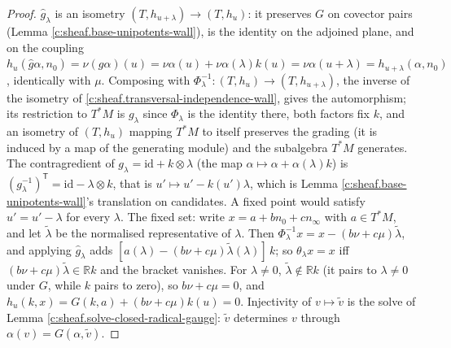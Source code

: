 \documentclass[11pt]{article}
\theoremstyle{definition}
\theoremstyle{plain}
\providecommand{\R}{}\renewcommand{\R}{\mathbb{R}}
\providecommand{\id}{}\renewcommand{\id}{\mathrm{id}}
\providecommand{\nInf}{}\renewcommand{\nInf}{n_\infty}
\providecommand{\nO}{}\renewcommand{\nO}{n_0}
\begin{document}
\begin{proof}
$\hat g_\lambda$ is an isometry $(T, h_{u+\lambda}) \to (T, h_u)$: it preserves $G$ on covector pairs (Lemma \ref{c:sheaf.base-unipotents-wall}), is the identity on the adjoined plane, and on the coupling $h_u(\hat g\alpha, \nO) = \nu(g\alpha)(u) = \nu\alpha(u) + \nu\alpha(\lambda)k(u) = \nu\alpha(u+\lambda) = h_{u+\lambda}(\alpha, \nO)$, identically with $\mu$. Composing with $\Phi_\lambda^{-1} : (T, h_u) \to (T, h_{u+\lambda})$, the inverse of the isometry of \ref{c:sheaf.transversal-independence-wall}, gives the automorphism; its restriction to $T^*M$ is $g_\lambda$ since $\Phi_\lambda$ is the identity there, both factors fix $k$, and an isometry of $(T, h_u)$ mapping $T^*M$ to itself preserves the grading (it is induced by a map of the generating module) and the subalgebra $T^*M$ generates. The contragredient of $g_\lambda = \id + k \otimes \lambda$ (the map $\alpha \mapsto \alpha + \alpha(\lambda)k$) is $(g_\lambda^{-1})^{\mathsf{T}} = \id - \lambda \otimes k$, that is $u' \mapsto u' - k(u')\lambda$, which is Lemma \ref{c:sheaf.base-unipotents-wall}'s translation on candidates. A fixed point would satisfy $u' = u' - \lambda$ for every $\lambda$. The fixed set: write $x = a + b\nO + c\nInf$ with $a \in T^*M$, and let $\tilde\lambda$ be the normalised representative of $\lambda$. Then $\Phi_\lambda^{-1}x = x - (b\nu + c\mu)\tilde\lambda$, and applying $\hat g_\lambda$ adds $[a(\lambda) - (b\nu + c\mu)\tilde\lambda(\lambda)]\,k$; so $\theta_\lambda x = x$ iff $(b\nu + c\mu)\tilde\lambda \in \R k$ and the bracket vanishes. For $\lambda \neq 0$, $\tilde\lambda \notin \R k$ (it pairs to $\lambda \neq 0$ under $G$, while $k$ pairs to zero), so $b\nu + c\mu = 0$, and $h_u(k, x) = G(k, a) + (b\nu + c\mu)k(u) = 0$. Injectivity of $v \mapsto \tilde v$ is the solve of Lemma \ref{c:sheaf.solve-closed-radical-gauge}: $\tilde v$ determines $v$ through $\alpha(v) = G(\alpha, \tilde v)$.

\end{proof}
\end{document}
